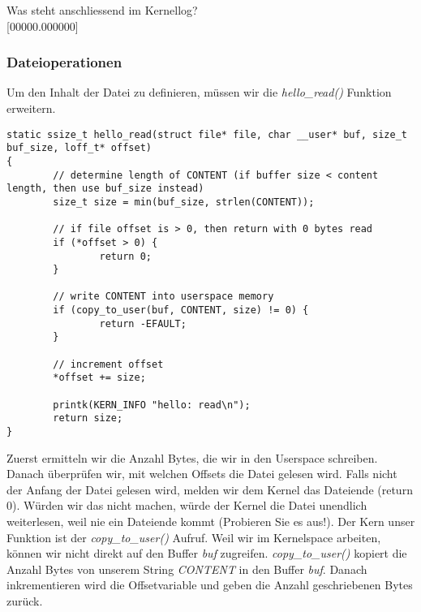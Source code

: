 Was steht anschliessend im Kernellog? \\

[00000.000000] \underline{\hspace{0.5\textwidth}} \newline
[00000.000000] \underline{\hspace{0.5\textwidth}} \newline
[00000.000000] \underline{\hspace{0.5\textwidth}} \newline
[00000.000000] \underline{\hspace{0.5\textwidth}} \newline
[00000.000000] \underline{\hspace{0.5\textwidth}} \newline
[00000.000000] \underline{\hspace{0.5\textwidth}} \newline
[00000.000000] \underline{\hspace{0.5\textwidth}} \newline

\subsubsection{Dateioperationen}

Um den Inhalt der Datei zu definieren, müssen wir die \emph{hello\_read()} Funktion erweitern.
\begin{lstlisting}
static ssize_t hello_read(struct file* file, char __user* buf, size_t buf_size, loff_t* offset)
{
        // determine length of CONTENT (if buffer size < content length, then use buf_size instead)
        size_t size = min(buf_size, strlen(CONTENT));

        // if file offset is > 0, then return with 0 bytes read
        if (*offset > 0) {
                return 0;
        }

        // write CONTENT into userspace memory
        if (copy_to_user(buf, CONTENT, size) != 0) {
                return -EFAULT;
        }

        // increment offset
        *offset += size;

        printk(KERN_INFO "hello: read\n");
        return size;
}
\end{lstlisting}

Zuerst ermitteln wir die Anzahl Bytes, die wir in den Userspace schreiben. Danach überprüfen wir, mit welchen Offsets die
Datei gelesen wird. Falls nicht der Anfang der Datei gelesen wird, melden wir dem Kernel das Dateiende (return 0). Würden
wir das nicht machen, würde der Kernel die Datei unendlich weiterlesen, weil nie ein Dateiende kommt (Probieren Sie es aus!).
Der Kern unser Funktion ist der \emph{copy\_to\_user()} Aufruf. Weil wir im Kernelspace arbeiten, können wir nicht direkt
auf den Buffer \emph{buf} zugreifen. \emph{copy\_to\_user()} kopiert die Anzahl Bytes von unserem String 
\emph{CONTENT} in den Buffer \emph{buf}. Danach inkrementieren wird die Offsetvariable und geben die Anzahl geschriebenen
Bytes zurück. \\

